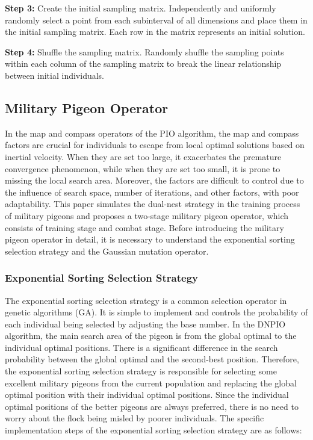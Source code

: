 \documentclass[preprint,review,compress,12pt]{elsarticle}
\begin{document}
{\bf Step 3:} Create the initial sampling matrix. Independently and uniformly randomly select a point from each subinterval of all dimensions and place them in the initial sampling matrix. Each row in the matrix represents an initial solution.

{\bf Step 4:} Shuffle the sampling matrix. Randomly shuffle the sampling points within each column of the sampling matrix to break the linear relationship between initial individuals.

\subsection{Military Pigeon Operator}
In the map and compass operators of the PIO algorithm, the map and compass factors are crucial for individuals to escape from local optimal solutions based on inertial velocity. When they are set too large, it exacerbates the premature convergence phenomenon, while when they are set too small, it is prone to missing the local search area. Moreover, the factors are difficult to control due to the influence of search space, number of iterations, and other factors, with poor adaptability. This paper simulates the dual-nest strategy in the training process of military pigeons and proposes a two-stage military pigeon operator, which consists of training stage and combat stage. Before introducing the military pigeon operator in detail, it is necessary to understand the exponential sorting selection strategy and the Gaussian mutation operator.

\subsubsection{Exponential Sorting Selection Strategy}
The exponential sorting selection strategy \cite{shehab2021enhanced,abualigah2022selection} is a common selection operator in genetic algorithms (GA). It is simple to implement and controls the probability of each individual being selected by adjusting the base number. In the DNPIO algorithm, the main search area of the pigeon is from the global optimal to the individual optimal positions. There is a significant difference in the search probability between the global optimal and the second-best position. Therefore, the exponential sorting selection strategy is responsible for selecting some excellent military pigeons from the current population and replacing the global optimal position with their individual optimal positions. Since the individual optimal positions of the better pigeons are always preferred, there is no need to worry about the flock being misled by poorer individuals. The specific implementation steps of the exponential sorting selection strategy are as follows:
\end{document}
